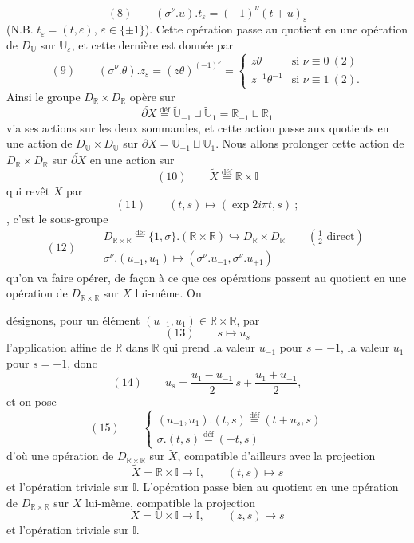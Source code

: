 \documentclass[11pt,a4paper]{article}
\begin{document}
\[
(8)\qquad (\sigma^\nu.u).t_\varepsilon = (-1)^\nu(t+u)_\varepsilon
\]
(N.B. $t_\varepsilon=(t,\varepsilon)$, $\varepsilon\in\{\pm1\}$).
Cette opération passe au quotient en une opération de $D_{\mathbb{U}}$ sur \struck{\ill{}} $\mathbb{U}_\varepsilon$, et cette dernière est donnée par
\[
(9)\qquad (\sigma^\nu.\theta).z_\varepsilon = (z\theta)^{(-1)^\nu} =
\begin{cases}
z\theta & \text{si } \nu\equiv0\ (2)\\
z^{-1}\theta^{-1} & \text{si } \nu\equiv1\ (2).
\end{cases}
\]
Ainsi le groupe $D_{\mathbb{R}}\times D_{\mathbb{R}}$ opère sur
\[
\widetilde{\partial X} \overset{\text{déf}}{=} \widetilde{\mathbb{U}}_{-1}\sqcup\widetilde{\mathbb{U}}_{1} = \mathbb{R}_{-1}\sqcup\mathbb{R}_{1}
\]
via ses actions sur les deux sommandes, et cette action \ill{} passe aux quotients en une action de $D_{\mathbb{U}}\times D_{\mathbb{U}}$ sur \struck{\ill{}} $\partial X=\mathbb{U}_{-1}\sqcup\mathbb{U}_{1}$. Nous allons prolonger cette action de $D_{\mathbb{R}}\times D_{\mathbb{R}}$ sur $\widetilde{\partial X}$ en une action sur
\[
(10)\qquad \widetilde{X} \overset{\text{déf}}{=} \mathbb{R}\times\mathbb{I}
\]
qui revêt $X$ par
\[
(11)\qquad (t,s)\longmapsto(\exp 2i\pi t, s)\ ;
\]
 , c'est le sous-groupe
\[
(12)\qquad
\begin{gathered}
D_{\mathbb{R}\times\mathbb{R}} \overset{\text{déf}}{=} \{1,\sigma\}.(\mathbb{R}\times\mathbb{R}) \hookrightarrow D_{\mathbb{R}}\times D_{\mathbb{R}}\qquad(\tfrac12\text{ direct})\\
\sigma^\nu.(u_{-1},u_1)\longmapsto(\sigma^\nu.u_{-1},\sigma^\nu.u_{+1})
\end{gathered}
\]
qu'on va faire opérer, de façon à ce que ces opérations passent au quotient en une opération de $D_{\mathbb{R}\times\mathbb{R}}$ sur $X$ lui-même. On

désignons, pour un élément
$(u_{-1},u_1)\in\mathbb{R}\times\mathbb{R}$,
par
\[
(13)\qquad s\longmapsto u_s
\]
l'application affine de $\mathbb{R}$ dans $\mathbb{R}$  qui prend la valeur $u_{-1}$ pour $s=-1$, la valeur $u_1$ pour $s=+1$, \struck{\ill{}} donc
\[
(14)\qquad u_s = \frac{u_1-u_{-1}}{2}\,s + \frac{u_1+u_{-1}}{2},
\]
et on pose
\[
(15)\qquad
\begin{cases}
(u_{-1},u_1).(t,s) \overset{\text{déf}}{=} (t+u_s,s)\\
\sigma.(t,s) \overset{\text{déf}}{=} (-t,s)
\end{cases}
\]
d'où une opération de $D_{\mathbb{R}\times\mathbb{R}}$ sur $\widetilde{X}$, compatible d'ailleurs avec la projection
\[
\widetilde{X}=\mathbb{R}\times\mathbb{I}\longrightarrow\mathbb{I},\qquad (t,s)\longmapsto s
\]
et l'opération triviale sur $\mathbb{I}$. L'opération passe bien au quotient en une opération de $D_{\mathbb{R}\times\mathbb{R}}$ sur $X$ lui-même, compatible  la projection
\[
X=\mathbb{U}\times\mathbb{I}\longrightarrow\mathbb{I},\qquad (z,s)\longmapsto s
\]
et l'opération triviale sur $\mathbb{I}$.
\end{document}
